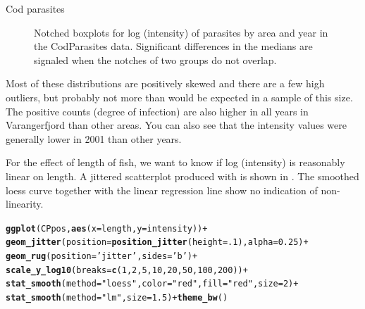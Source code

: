 \documentclass[11pt]{book}\usepackage[]{graphicx}\usepackage[]{color}
\makeatletter
\newcommand{\hlnum}[1]{\textcolor[rgb]{0.686,0.059,0.569}{#1}}%
\newcommand{\hlstr}[1]{\textcolor[rgb]{0.192,0.494,0.8}{#1}}%
\newcommand{\hlopt}[1]{\textcolor[rgb]{0,0,0}{#1}}%
\newcommand{\hlstd}[1]{\textcolor[rgb]{0.345,0.345,0.345}{#1}}%
\newcommand{\hlkwc}[1]{\textcolor[rgb]{0.333,0.667,0.333}{#1}}%
\newcommand{\hlkwd}[1]{\textcolor[rgb]{0.737,0.353,0.396}{\textbf{#1}}}%
\newenvironment{kframe}{%
 \def\at@end@of@kframe{}%
 \ifinner\ifhmode%
  \def\at@end@of@kframe{\end{minipage}}%
  \begin{minipage}{\columnwidth}%
 \fi\fi%
 \def\FrameCommand##1{\hskip\@totalleftmargin \hskip-\fboxsep
 \colorbox{shadecolor}{##1}\hskip-\fboxsep
     \hskip-\linewidth \hskip-\@totalleftmargin \hskip\columnwidth}%
 \MakeFramed {\advance\hsize-\width
   \@totalleftmargin\z@ \linewidth\hsize
   \@setminipage}}%
 {\par\unskip\endMakeFramed%
 \at@end@of@kframe}
\newenvironment{knitrout}{}{} %
\renewenvironment{knitrout}{\small\renewcommand{\baselinestretch}{.85}}{} %
\makeatother
\begin{document}
\begin{Example}[cod1]{Cod parasites}
\begin{knitrout}
\begin{figure}[!htbp]
\caption[Notched boxplots for log (intensity) of parasites by area and year in the CodParasites data]{Notched boxplots for log (intensity) of parasites by area and year in the CodParasites data. Significant differences in the medians are signaled when the notches of two groups do not overlap.\label{fig:cod1-boxplot}}
\end{figure}


\end{knitrout}
Most of these distributions are positively skewed and
there are a few high outliers, but probably not more than would be expected in a sample of this size.
The positive counts (degree of infection) are also higher in all years in Varangerfjord than other
areas. You can also see that the intensity values were generally lower in 2001 than other years.

For the effect of length of fish, we want to know if log (intensity) is reasonably
linear on length.  A jittered scatterplot produced with  is shown in .
The smoothed loess curve together with the linear regression line show no indication of non-linearity.

\begin{knitrout}
\color{fgcolor}\begin{kframe}
\begin{alltt}
\hlkwd{ggplot}\hlstd{(CPpos,} \hlkwd{aes}\hlstd{(}\hlkwc{x}\hlstd{=length,} \hlkwc{y}\hlstd{=intensity))} \hlopt{+}
  \hlkwd{geom_jitter}\hlstd{(}\hlkwc{position}\hlstd{=}\hlkwd{position_jitter}\hlstd{(}\hlkwc{height}\hlstd{=}\hlnum{.1}\hlstd{),} \hlkwc{alpha}\hlstd{=}\hlnum{0.25}\hlstd{)} \hlopt{+}
  \hlkwd{geom_rug}\hlstd{(}\hlkwc{position}\hlstd{=}\hlstr{'jitter'}\hlstd{,} \hlkwc{sides}\hlstd{=}\hlstr{'b'}\hlstd{)} \hlopt{+}
  \hlkwd{scale_y_log10}\hlstd{(}\hlkwc{breaks}\hlstd{=}\hlkwd{c}\hlstd{(}\hlnum{1}\hlstd{,}\hlnum{2}\hlstd{,}\hlnum{5}\hlstd{,}\hlnum{10}\hlstd{,}\hlnum{20}\hlstd{,}\hlnum{50}\hlstd{,}\hlnum{100}\hlstd{,} \hlnum{200}\hlstd{))} \hlopt{+}
  \hlkwd{stat_smooth}\hlstd{(}\hlkwc{method}\hlstd{=}\hlstr{"loess"}\hlstd{,} \hlkwc{color}\hlstd{=}\hlstr{"red"}\hlstd{,} \hlkwc{fill}\hlstd{=}\hlstr{"red"}\hlstd{,} \hlkwc{size}\hlstd{=}\hlnum{2}\hlstd{)} \hlopt{+}
  \hlkwd{stat_smooth}\hlstd{(}\hlkwc{method}\hlstd{=}\hlstr{"lm"}\hlstd{,} \hlkwc{size}\hlstd{=}\hlnum{1.5}\hlstd{)} \hlopt{+} \hlkwd{theme_bw}\hlstd{()}
\end{alltt}
\end{kframe}\begin{figure}[!htbp]


\end{figure}
\end{knitrout}
\end{Example}
\end{document}
